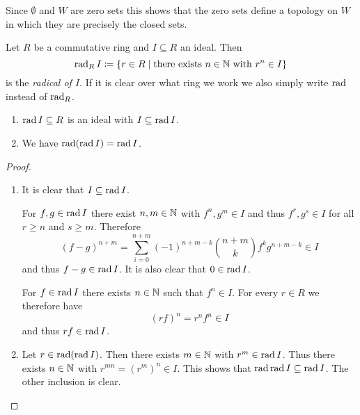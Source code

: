\begin{rem}
  Since $\emptyset$ and $W$ are zero sets this shows that the zero sets define a topology on $W$ in which they are precisely the closed sets.
\end{rem}


\begin{defi}
  Let $R$ be a commutative ring and $I \subseteq R$ an ideal. Then
  \[
              \operatorname{rad}_R I
    \coloneqq \{
                r \in R
              \mid
                \text{there exists }
                n \in \mathbb{N}
                \text{ with }
                r^n \in I
              \}
  \]
  is the \emph{radical of $I$}.
  If it is clear over what ring we work we also simply write $\operatorname{rad}$ instead of $\operatorname{rad}_R$.
\end{defi}


\begin{lem}
  \begin{enumerate}[label=\emph{\alph*)},leftmargin=*]
    Let $R$ be a commutative ring and $I \subseteq R$ an ideal. 
    \item
      $\operatorname{rad} I  \subseteq R$ is an ideal with $I \subseteq \operatorname{rad} I$.
    \item
      We have $\operatorname{rad}(\operatorname{rad} I) = \operatorname{rad} I$.
  \end{enumerate}
\end{lem}
\begin{proof}
  \begin{enumerate}[label=\emph{\alph*)},leftmargin=*]
    \item
      It is clear that $I \subseteq \operatorname{rad} I$.
      
      For $f,g \in \operatorname{rad} I$ there exist $n,m \in \mathbb{N}$ with $f^n, g^m \in I$ and thus $f^r, g^s \in I$ for all $r \geq n$ and $s \geq m$. Therefore
      \[
            (f - g)^{n+m}
        =   \sum_{i=0}^{n+m} (-1)^{n+m-k} \binom{n+m}{k} f^k g^{n+m-k}
        \in I
      \]
      and thus $f-g \in \operatorname{rad} I$. It is also clear that $0 \in \operatorname{rad} I$.
      
      For $f \in \operatorname{rad} I$ there exists $n \in \mathbb{N}$ such that $f^n \in I$.
      For every $r \in R$ we therefore have
      \[
            (rf)^n
        =   r^n f^n
        \in I
      \]
      and thus $rf \in \operatorname{rad} I$.
    \item
      Let $r \in \operatorname{rad}(\operatorname{rad} I)$.
      Then there exists $m \in \mathbb{N}$ with $r^m \in \operatorname{rad} I$.
      Thus there exists $n \in \mathbb{N}$ with $r^{mn} = (r^m)^n \in I$.
      This shows that $\operatorname{rad} \operatorname{rad} I \subseteq \operatorname{rad} I$.
      The other inclusion is clear.
    \qedhere
  \end{enumerate}
\end{proof}


